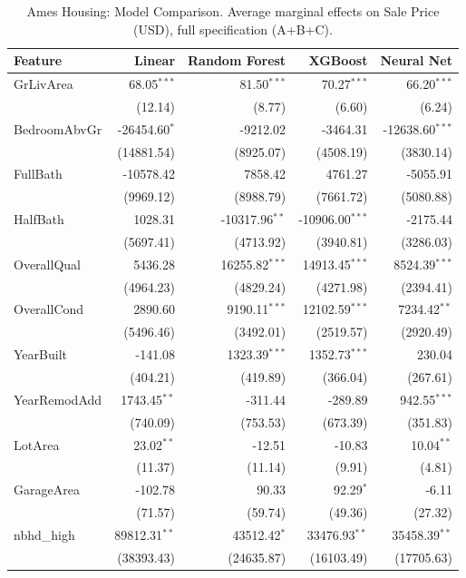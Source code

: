 \begin{table}[htbp]
\centering
\small
\begin{threeparttable}
\caption{Ames Housing: Model Comparison. Average marginal effects on Sale Price (USD), full specification (A+B+C).}
\label{tab:ames_housing_model_comparison}
\begin{tabular}{lrrrr}
\toprule
Feature & Linear & Random Forest & XGBoost & Neural Net \\
\midrule
GrLivArea & 68.05$^{***}$ & 81.50$^{***}$ & 70.27$^{***}$ & 66.20$^{***}$ \\
 & (12.14) & (8.77) & (6.60) & (6.24) \\
BedroomAbvGr & -26454.60$^{*}$ & -9212.02 & -3464.31 & -12638.60$^{***}$ \\
 & (14881.54) & (8925.07) & (4508.19) & (3830.14) \\
FullBath & -10578.42 & 7858.42 & 4761.27 & -5055.91 \\
 & (9969.12) & (8988.79) & (7661.72) & (5080.88) \\
HalfBath & 1028.31 & -10317.96$^{**}$ & -10906.00$^{***}$ & -2175.44 \\
 & (5697.41) & (4713.92) & (3940.81) & (3286.03) \\
\midrule
OverallQual & 5436.28 & 16255.82$^{***}$ & 14913.45$^{***}$ & 8524.39$^{***}$ \\
 & (4964.23) & (4829.24) & (4271.98) & (2394.41) \\
OverallCond & 2890.60 & 9190.11$^{***}$ & 12102.59$^{***}$ & 7234.42$^{**}$ \\
 & (5496.46) & (3492.01) & (2519.57) & (2920.49) \\
YearBuilt & -141.08 & 1323.39$^{***}$ & 1352.73$^{***}$ & 230.04 \\
 & (404.21) & (419.89) & (366.04) & (267.61) \\
YearRemodAdd & 1743.45$^{**}$ & -311.44 & -289.89 & 942.55$^{***}$ \\
 & (740.09) & (753.53) & (673.39) & (351.83) \\
\midrule
LotArea & 23.02$^{**}$ & -12.51 & -10.83 & 10.04$^{**}$ \\
 & (11.37) & (11.14) & (9.91) & (4.81) \\
GarageArea & -102.78 & 90.33 & 92.29$^{*}$ & -6.11 \\
 & (71.57) & (59.74) & (49.36) & (27.32) \\
nbhd\_high & 89812.31$^{**}$ & 43512.42$^{*}$ & 33476.93$^{**}$ & 35458.39$^{**}$ \\
 & (38393.43) & (24635.87) & (16103.49) & (17705.63) \\

\end{tabular}
\end{threeparttable}
\end{table}

